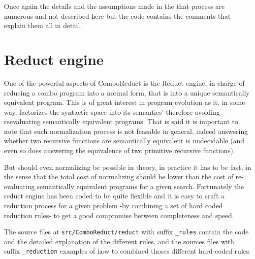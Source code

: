 \documentclass{article}
\begin{document}
  Once again the details and the assumptions made in the that process are
  numerous and not described here but the code contains the comments that
  explain them all in detail.

  \section{Reduct engine}

  One of the powerful aspects of ComboReduct is the Reduct engine,
  in charge of reducing a combo program into a normal form, that is into
  a unique semantically equivalent program. This is of great interest
  in program evolution as it, in some way, factorizes the syntactic
  space into its semantics' therefore avoiding reevaluating
  semantically equivalent programs. That is said it is important to note
  that such normalization process is not feasable in general, indeed 
  answering whether two recursive functions are semantically equivalent
  is undecidable (and even so does answering the equivalence of
  two primitive recursive functions).

  But should even normalizing be possible in theory, in practice
  it has to be fast, in the sense that the total cost of
  normalizing should be lower than the cost of re-evaluating
  semantically equivalent programs for a given search.
  Fortunately the reduct engine has been coded to be quite flexible and
  it is easy to craft a reduction process
  for a given problem -by combining a set of hard coded reduction rules-
  to get a good compromise between completeness and speed.

  The source files at \verb|src/ComboReduct/reduct| with suffix \verb|_rules|
  contain the code and the detailed explanation of the different rules,
  and the sources files with suffix \verb|_reduction| examples of
  how to combined thoses different hard-coded rules.
\end{document}
